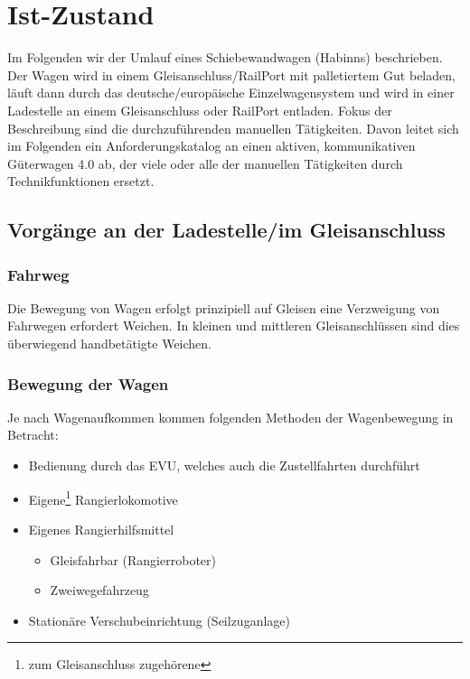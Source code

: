 \section{Ist-Zustand} %
Im Folgenden wir der Umlauf eines \gls{Schiebewandwagen} (Habinns) beschrieben. Der Wagen wird in einem \gls{Gleisanschluss}/RailPort mit palletiertem Gut beladen, läuft dann durch das deutsche/europäische Einzelwagensystem und wird in einer Ladestelle an einem Gleisanschluss oder RailPort entladen. Fokus der Beschreibung sind die durchzuführenden manuellen Tätigkeiten. Davon leitet sich im Folgenden ein Anforderungskatalog an einen aktiven, kommunikativen Güterwagen 4.0 ab, der viele oder alle der manuellen Tätigkeiten durch Technikfunktionen ersetzt.

\subsection{Vorgänge an der Ladestelle/im Gleisanschluss}
\subsubsection{Fahrweg} \label{sec:Fahrweg}
Die Bewegung von Wagen erfolgt prinzipiell auf Gleisen eine Verzweigung von Fahrwegen erfordert Weichen. In kleinen und mittleren Gleisanschlüssen sind dies überwiegend handbetätigte Weichen. 
\subsubsection{Bewegung der Wagen} \label{sec:BewdWagen}
Je nach Wagenaufkommen kommen folgenden Methoden der Wagenbewegung in Betracht:
\begin{itemize}
	\item Bedienung durch das \acrshort{EVU}, welches auch die Zustellfahrten durchführt
	\item Eigene\footnote{zum \gls{Gleisanschluss} zugehörene} Rangierlokomotive
	\item Eigenes Rangierhilfsmittel
	\begin{itemize}
	    \item Gleisfahrbar (Rangierroboter)
	    \item Zweiwegefahrzeug
	\end{itemize}
	\item Stationäre Verschubeinrichtung (Seilzuganlage)
\end{itemize}
